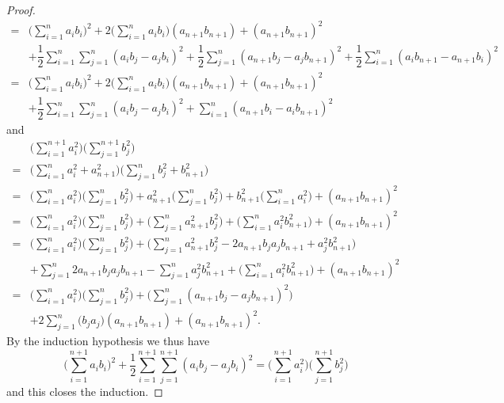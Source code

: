 \begin{proof}
\begin{align*}
    = & \bigg(\sum_{i = 1}^n a_i b_i\bigg)^2 + 2 \bigg(\sum_{i = 1}^n a_i b_i\bigg) (a_{n + 1} b_{n + 1}) + (a_{n + 1} b_{n + 1})^2                                                                                \\
      & + \dfrac{1}{2} \sum_{i = 1}^n \sum_{j = 1}^n (a_i b_j - a_j b_i)^2 + \dfrac{1}{2} \sum_{j = 1}^n (a_{n + 1} b_j - a_j b_{n + 1})^2 + \dfrac{1}{2} \sum_{i = 1}^n (a_i b_{n + 1} - a_{n + 1} b_i)^2         \\
    = & \bigg(\sum_{i = 1}^n a_i b_i\bigg)^2 + 2 \bigg(\sum_{i = 1}^n a_i b_i\bigg) (a_{n + 1} b_{n + 1}) + (a_{n + 1} b_{n + 1})^2                                                                                \\
      & + \dfrac{1}{2} \sum_{i = 1}^n \sum_{j = 1}^n (a_i b_j - a_j b_i)^2 + \sum_{i = 1}^n (a_{n + 1} b_i - a_i b_{n + 1})^2
  \end{align*}
  and
  \begin{align*}
      & \bigg(\sum_{i = 1}^{n + 1} a_i^2\bigg) \bigg(\sum_{j = 1}^{n + 1} b_j^2\bigg)                                                                                                             \\
    = & \bigg(\sum_{i = 1}^n a_i^2 + a_{n + 1}^2\bigg) \bigg(\sum_{j = 1}^n b_j^2 + b_{n + 1}^2\bigg)                                                                                             \\
    = & \bigg(\sum_{i = 1}^n a_i^2\bigg) \bigg(\sum_{j = 1}^n b_j^2\bigg) + a_{n + 1}^2 \bigg(\sum_{j = 1}^n b_j^2\bigg) + b_{n + 1}^2 \bigg(\sum_{i = 1}^n a_i^2\bigg) + (a_{n + 1} b_{n + 1})^2 \\
    = & \bigg(\sum_{i = 1}^n a_i^2\bigg) \bigg(\sum_{j = 1}^n b_j^2\bigg) + \bigg(\sum_{j = 1}^n a_{n + 1}^2 b_j^2\bigg) + \bigg(\sum_{i = 1}^n a_i^2 b_{n + 1}^2\bigg) + (a_{n + 1} b_{n + 1})^2 \\
    = & \bigg(\sum_{i = 1}^n a_i^2\bigg) \bigg(\sum_{j = 1}^n b_j^2\bigg) + \bigg(\sum_{j = 1}^n a_{n + 1}^2 b_j^2 - 2 a_{n + 1} b_j a_j b_{n + 1} + a_j^2 b_{n + 1}^2\bigg)                      \\
      & + \sum_{j = 1}^n 2 a_{n + 1} b_j a_j b_{n + 1} - \sum_{j = 1}^n a_j^2 b_{n + 1}^2 + \bigg(\sum_{i = 1}^n a_i^2 b_{n + 1}^2\bigg) + (a_{n + 1} b_{n + 1})^2                                \\
    = & \bigg(\sum_{i = 1}^n a_i^2\bigg) \bigg(\sum_{j = 1}^n b_j^2\bigg) + \bigg(\sum_{j = 1}^n (a_{n + 1} b_j - a_j b_{n + 1})^2\bigg)                                                          \\
      & + 2 \sum_{j = 1}^n \bigg(b_j a_j\bigg)(a_{n + 1} b_{n + 1}) + (a_{n + 1} b_{n + 1})^2.
  \end{align*}
  By the induction hypothesis we thus have
  \[
    \bigg(\sum_{i = 1}^{n + 1} a_i b_i\bigg)^2 + \dfrac{1}{2} \sum_{i = 1}^{n + 1} \sum_{j = 1}^{n + 1} (a_i b_j - a_j b_i)^2 = \bigg(\sum_{i = 1}^{n + 1} a_i^2\bigg) \bigg(\sum_{j = 1}^{n + 1} b_j^2\bigg)
  \]
  and this closes the induction.


\end{proof}
